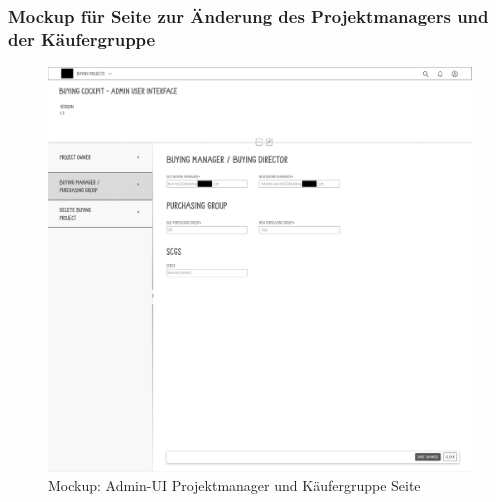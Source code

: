 \subsubsection[Mockup für Seite zur Änderung des Projektmanagers und der Käufergruppe]{Mockup für Seite zur Änderung des Projektmanagers und der Käufergruppe}
\begin{figure}[H]
    \centering
    \includegraphics[width=\linewidth]{Images/Mockup_PM_anonym.png}
    \caption[Mockup: Admin-UI Projektmanager und Käufergruppe Seite]{Mockup: Admin-UI Projektmanager und Käufergruppe Seite}
\end{figure}

